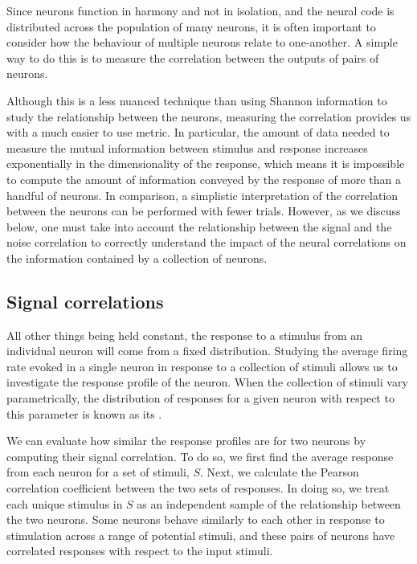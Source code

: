 Since neurons function in harmony and not in isolation, and the neural code is distributed across the population of many neurons, it is often important to consider how the behaviour of multiple neurons relate to one-another.
A simple way to do this is to measure the correlation between the outputs of pairs of neurons.

Although this is a less nuanced technique than using Shannon information to study the relationship between the neurons, measuring the correlation provides us with a much easier to use metric.
In particular, the amount of data needed to measure the mutual information between stimulus and response increases exponentially in the dimensionality of the response, which means it is impossible to compute the amount of information conveyed by the response of more than a handful of neurons.
In comparison, a simplistic interpretation of the correlation between the neurons can be performed with fewer trials.
However, as we discuss below, one must take into account the relationship between the signal and the noise correlation to correctly understand the impact of the neural correlations on the information contained by a collection of neurons.


\subsection{Signal correlations}
\label{sec:bg-sigcorr}

All other things being held constant, the response to a stimulus from an individual neuron will come from a fixed distribution.
Studying the average firing rate evoked in a single neuron in response to a collection of stimuli allows us to investigate the response profile of the neuron.
When the collection of stimuli vary parametrically, the distribution of responses for a given neuron with respect to this parameter is known as its .

We can evaluate how similar the response profiles are for two neurons by computing their signal correlation.
To do so, we first find the average response from each neuron for a set of stimuli, $S$.
Next, we calculate the Pearson correlation coefficient between the two sets of responses.
In doing so, we treat each unique stimulus in $S$ as an independent sample of the relationship between the two neurons.
Some neurons behave similarly to each other in response to stimulation across a range of potential stimuli, and these pairs of neurons have correlated responses with respect to the input stimuli.

